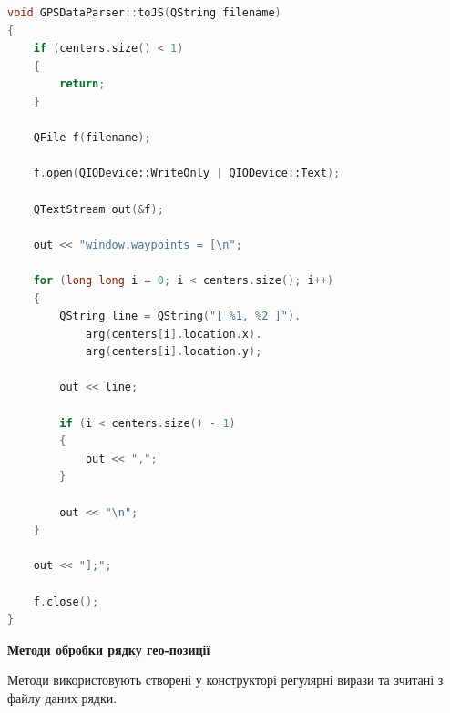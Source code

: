 \documentclass[simple,a4paper,14pt,ukrainian,utf8]{eskdtext}
\begin{document}
\begin{small}        
\begin{lstlisting}[language=C++]
void GPSDataParser::toJS(QString filename)
{
    if (centers.size() < 1)
    {
        return;
    }

    QFile f(filename);

    f.open(QIODevice::WriteOnly | QIODevice::Text);

    QTextStream out(&f);

    out << "window.waypoints = [\n";

    for (long long i = 0; i < centers.size(); i++)
    {
        QString line = QString("[ %1, %2 ]").
        	arg(centers[i].location.x).
        	arg(centers[i].location.y);

        out << line;

        if (i < centers.size() - 1)
        {
            out << ",";
        }

        out << "\n";
    }

    out << "];";

    f.close();
}
\end{lstlisting}
\end{small}

		\textbf{Методи обробки рядку гео-позиції}
		
		Методи використовують створені у конструкторі регулярні вирази та зчитані з файлу даних рядки.
		
\end{document}
